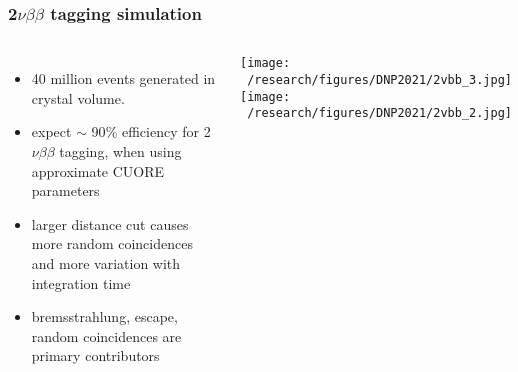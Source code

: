 \documentclass{beamer}
\begin{document}
	\begin{frame}
		\frametitle{2$\nu\beta\beta$ tagging simulation}
		\begin{columns}[c] %
			
			\begin{itemize}
				\setlength\itemsep{2em}
				\item 40 million events generated in crystal volume.
				\item expect $\sim$ 90$\%$ efficiency for 2$\nu\beta\beta$ tagging, when using approximate CUORE parameters
				\item larger distance cut causes more random coincidences and more variation with integration time
				\item bremsstrahlung, escape, random coincidences are primary contributors
			\end{itemize}
			
			\hspace*{0.5cm}\texttt{[image: ~/research/figures/DNP2021/2vbb\_3.jpg]}
			\medskip
			\hspace*{0.5cm}\texttt{[image: ~/research/figures/DNP2021/2vbb\_2.jpg]}
			
		\end{columns}
	\end{frame}
\end{document}
